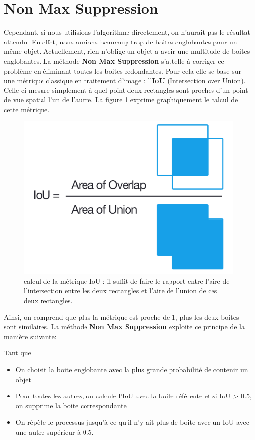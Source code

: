 \section{Non Max Suppression}

Cependant, si nous utilisions l'algorithme directement, on n'aurait pas le résultat attendu. En effet, nous aurions beaucoup trop de boites englobantes pour un même objet. Actuellement, rien n'oblige un objet a avoir une multitude de boites englobantes. La méthode \textbf{Non Max Suppression} s'attelle à corriger ce problème en éliminant toutes les boites redondantes. Pour cela elle se base sur une métrique classique en traitement d'image : l'\textbf{IoU} (Intersection over Union). Celle-ci mesure simplement à quel point deux rectangles sont proches d'un point de vue spatial l'un de l'autre. La figure \ref{IoU} exprime graphiquement le calcul de cette métrique.

\begin{figure}[!h]
\centering
\includegraphics[width=100pts]{images/Mask_R_CNN/IoU.png} 
\caption{calcul de la métrique IoU : il suffit de faire le rapport entre l'aire de l'intersection entre les deux rectangles et l'aire de l'union de ces deux rectangles.}
\label{IoU}
\end{figure}

Ainsi, on comprend que plus la métrique est proche de 1, plus les deux boites sont similaires. La méthode \textbf{Non Max Suppression} exploite ce principe de la manière suivante:

Tant que 
\begin{itemize}
\item On choisit la boite englobante avec la plus grande probabilité de contenir un objet
\item Pour toutes les autres, on calcule l'IoU avec la boite référente
et si IoU > 0.5, on supprime la boite correspondante
\item On répète le processus jusqu'à ce qu'il n'y ait plus de boite avec un IoU avec une autre supérieur à 0.5.
\end{itemize}